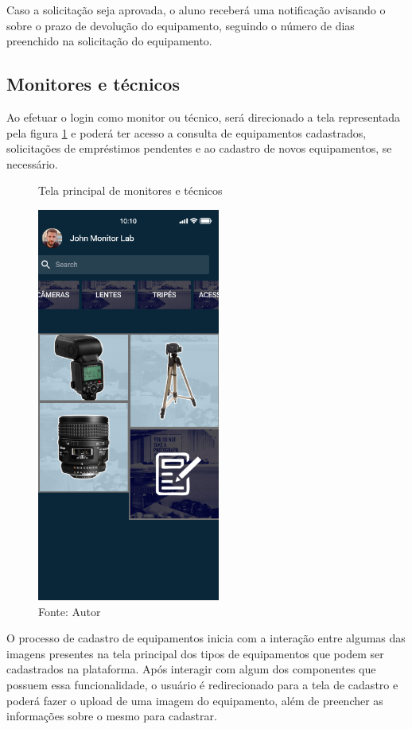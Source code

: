     Caso a solicitação seja aprovada, o aluno receberá uma notificação avisando o sobre o prazo de devolução do equipamento, seguindo o número de dias preenchido na solicitação do equipamento.
    
    \clearpage
    
    \subsection{Monitores e técnicos}
    
    Ao efetuar o login como monitor ou técnico, será direcionado a tela representada pela figura \ref{figure:home-aprovador-screen} e poderá ter acesso a consulta de equipamentos cadastrados, solicitações de empréstimos pendentes e ao cadastro de novos equipamentos, se necessário.
    
    \begin{figure}[h]
    \caption{Tela principal de monitores e técnicos}
    \centering %
    \includegraphics[width=6cm]{imagem/Home - Aprovador.png}
    \caption*{Fonte: Autor}
    \label{figure:home-aprovador-screen}
    \end{figure}
    
    O processo de cadastro de equipamentos inicia com a interação entre algumas das imagens presentes na tela principal dos tipos de equipamentos que podem ser cadastrados na plataforma. Após interagir com algum dos componentes que possuem essa funcionalidade, o usuário é redirecionado para a tela de cadastro e poderá fazer o upload de uma imagem do equipamento, além de preencher as informações sobre o mesmo para cadastrar.
    
